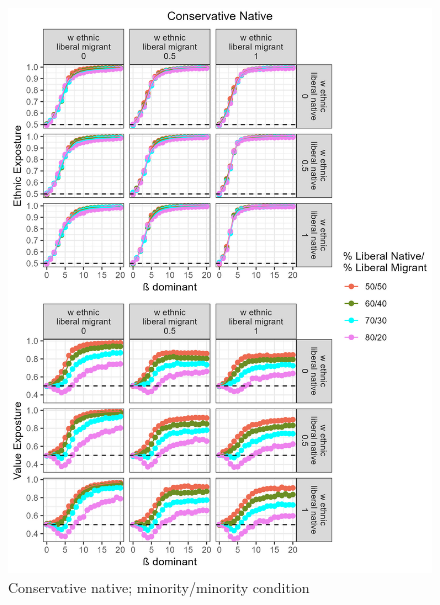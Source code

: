 \documentclass[
]{article}
\begin{document}
\begin{figure}[H]
    \centering
    \includegraphics{images/Conservative Native_vlsz.jpg}
    \caption{Conservative native; minority/minority condition}
    \label{fig:consnat}
\end{figure}
\end{document}

